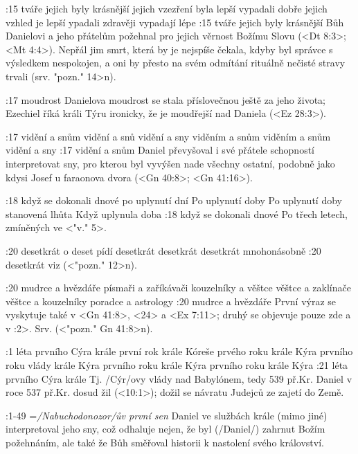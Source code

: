 :15  
    {tváře jejich byly krásnější}  %
    {jejich vzezření byla lepší} %
    {vypadali dobře}  %
    {jejich vzhled je lepší} %
    {ypadali zdravěji}  %
    {vypadají lépe}  %
:15 {tváře jejich byly krásnější} Bůh Danielovi a jeho přátelům požehnal pro jejich věrnost Božímu Slovu (<Dt 8:3>; <Mt 4:4>). Nepřál jim smrt, která by je nejspíše čekala, kdyby byl správce s výsledkem nespokojen, a oni by přesto na svém odmítání rituálně nečisté stravy trvali
(srv. \<"pozn." 14>n). 

:17 {moudrost} Danielova moudrost se stala příslovečnou ještě za jeho života; Ezechiel říká králi Týru ironicky, že je moudřejší nad Daniela (<Ez 28:3>). 

:17
    {vidění a snům}  %
    {vidění a snů} %
    {vidění a sny}  %
    {viděním a snům} %
    {viděním a snům}  %
    {vidění a sny}  %
:17 {vidění a snům} Daniel převyšoval i své přátele schopností interpretovat sny, pro kterou byl vyvýšen nade všechny ostatní, podobně jako kdysi Josef u faraonova dvora (<Gn 40:8>; <Gn 41:16>). 

:18  
    {když se dokonali dnové}  %
    {po uplynutí dní} %
    {Po uplynutí doby}  %
    {Po uplynutí doby} %
    {stanovená lhůta}  %
    {Když uplynula doba}  %
:18 {když se dokonali dnové} Po třech letech, zmíněných ve  <"v." 5>.

:20
    {desetkrát}  %
    {o deset pídí} %
    {desetkrát}  %
    {desetkrát} %
    {desetkrát}  %
    {mnohonásobně}  %
:20 {desetkrát} viz (<"pozn." 12>n).

:20
    {mudrce a hvězdáře}  %
    {písmaři a zaříkávači} %
    {kouzelníky a věštce}  %
    {věštce a zaklínače} %
    {věštce a kouzelníky}  %
    {poradce a astrology}  %
:20 {mudrce a hvězdáře} První výraz se vyskytuje také v <Gn 41:8>, <24> a <Ex 7:11>; druhý se objevuje pouze zde a v :2>. 
Srv. (<"pozn." Gn 41:8>n). \dopsat %

:1  
    {léta prvního Cýra krále}  %
    {první rok krále Kóreše} %
    {prvého roku krále Kýra}  %
    {prvního roku vlády krále Kýra} %
    {prvního roku krále Kýra}  %
    {prvního roku krále Kýra}  %
:21 {léta prvního Cýra krále} Tj. \x/Cýr/ovy vlády nad Babylónem, tedy 539 př.Kr. Daniel v roce 537 př.Kr. dosud žil (<10:1>); dožil se návratu Judejců ze zajetí do Země.

:1-49 {}={\it\x/Nabuchodonozor/ův první sen\/} Daniel ve službách krále (mimo jiné) interpretoval jeho sny, což odhaluje nejen, že  byl (\x/Daniel/) zahrnut Božím požehnáním, ale také že Bůh směřoval historii  k nastolení svého království.


